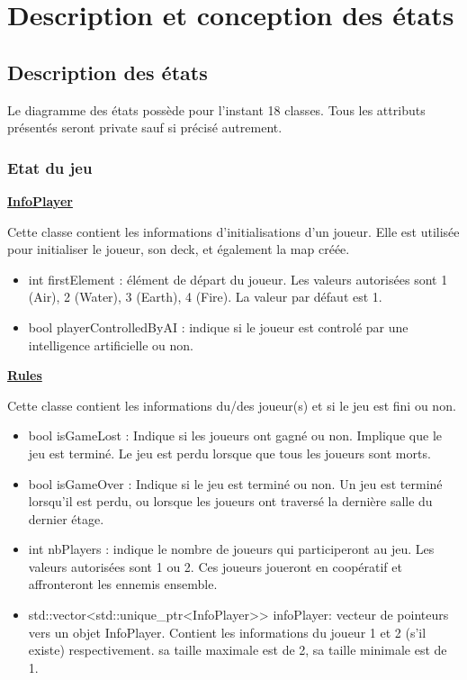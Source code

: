 \section{Description et conception des états}

\subsection{Description des états}

Le diagramme des états possède pour l'instant 18 classes. Tous les attributs présentés seront private sauf si précisé autrement.

\subsubsection{Etat du jeu}

\underline{\textbf{InfoPlayer}}
\par Cette classe contient les informations d'initialisations d'un joueur. Elle est utilisée pour initialiser le joueur, son deck, et également la map créée.

\begin{itemize}
        \item int firstElement : élément de départ du joueur. Les valeurs autorisées sont 1 (Air), 2 (Water), 3 (Earth), 4 (Fire). La valeur par défaut est 1. 
        \item  bool playerControlledByAI : indique si le joueur est controlé par une intelligence artificielle ou non.
\end{itemize}

\underline{\textbf{Rules}}
\par Cette classe contient les informations du/des joueur(s) et si le jeu est fini ou non.
\begin{itemize}
    \item bool isGameLost : Indique si les joueurs ont gagné ou non. Implique que le jeu est terminé. Le jeu est perdu lorsque que tous les joueurs sont morts.
    \item bool isGameOver : Indique si le jeu est terminé ou non. Un jeu est terminé lorsqu'il est perdu, ou lorsque les joueurs ont traversé la dernière salle du dernier étage.
    \item int nbPlayers : indique le nombre de joueurs qui participeront au jeu. Les valeurs autorisées sont 1 ou 2. Ces joueurs joueront en coopératif et affronteront les ennemis ensemble.
    \item  std::vector<std::unique\_ptr<InfoPlayer>> infoPlayer: vecteur de pointeurs vers un objet InfoPlayer. Contient les informations du joueur 1 et 2 (s'il existe) respectivement. sa taille maximale est de 2, sa taille minimale est de 1.
\end{itemize}

